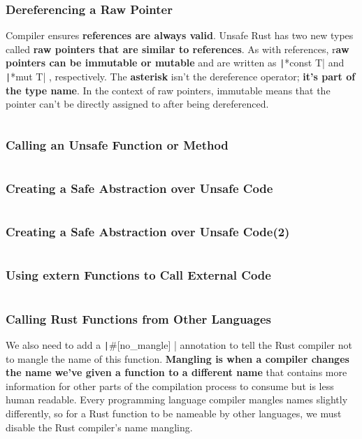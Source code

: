 \documentclass{beamer}
\begin{document}
\begin{frame}[fragile]
	\frametitle{Dereferencing a Raw Pointer}
	Compiler ensures \textbf{references are always valid}. Unsafe Rust has two new types called \textbf{raw pointers that are similar to references}. As with references, r\textbf{aw pointers can be immutable or mutable} and are written as \texttt|*const T| and \texttt|*mut T| , respectively. The \textbf{asterisk} isn’t the dereference operator; \textbf{it’s part of the type name}. In the context of raw pointers, immutable means that the pointer can’t be directly assigned to after being dereferenced.
	
	\inputminted{rust}{./code/unsafe1.rs}
\end{frame}


\begin{frame}[fragile]
	\frametitle{Calling an Unsafe Function or Method}
	\inputminted{rust}{./code/unsafe2.rs}
\end{frame}

\begin{frame}[fragile]
	\frametitle{Creating a Safe Abstraction over Unsafe Code}
	\inputminted[fontsize=\scriptsize]{rust}{./code/unsafe3.rs}
\end{frame}

\begin{frame}[fragile]
	\frametitle{Creating a Safe Abstraction over Unsafe Code(2)}
	\inputminted[fontsize=\scriptsize]{rust}{./code/unsafe4.rs}
\end{frame}

\begin{frame}[fragile]
	\frametitle{Using extern Functions to Call External Code}
	\inputminted{rust}{./code/unsafe5.rs}
\end{frame}

\begin{frame}[fragile]
	\frametitle{Calling Rust Functions from Other Languages}
	We also need to add a \texttt|#[no_mangle] | annotation to tell the Rust compiler not to mangle the name of this function. \textbf{Mangling is when a compiler changes the name we’ve given a function to a different name} that contains more information for other parts of the compilation process to consume but is less human readable. Every programming language compiler mangles names slightly differently, so for a Rust function to be nameable by other languages, we must disable the Rust compiler’s name mangling.
	
	\inputminted{rust}{./code/unsafe6.rs}
\end{frame}
\end{document}
